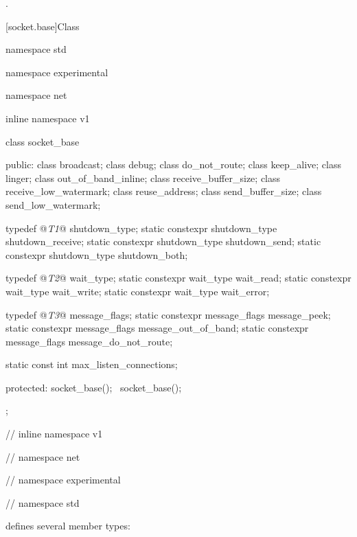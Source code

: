 \begin{itemdescr}
\pnum
\returns {}.
\end{itemdescr}



[socket.base]{Class }

\begin{codeblock}
namespace std {
namespace experimental {
namespace net {
inline namespace v1 {

  class socket_base
  {
  public:
    class broadcast;
    class debug;
    class do_not_route;
    class keep_alive;
    class linger;
    class out_of_band_inline;
    class receive_buffer_size;
    class receive_low_watermark;
    class reuse_address;
    class send_buffer_size;
    class send_low_watermark;

    typedef @\textit{T1}@ shutdown_type;
    static constexpr shutdown_type shutdown_receive;
    static constexpr shutdown_type shutdown_send;
    static constexpr shutdown_type shutdown_both;

    typedef @\textit{T2}@ wait_type;
    static constexpr wait_type wait_read;
    static constexpr wait_type wait_write;
    static constexpr wait_type wait_error;

    typedef @\textit{T3}@ message_flags;
    static constexpr message_flags message_peek;
    static constexpr message_flags message_out_of_band;
    static constexpr message_flags message_do_not_route;

    static const int max_listen_connections;

  protected:
    socket_base();
    ~socket_base();
  };

} // inline namespace v1
} // namespace net
} // namespace experimental
} // namespace std
\end{codeblock}

\pnum
{} defines several member types:

